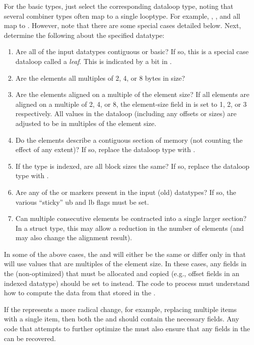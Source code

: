 \documentclass{article}
\begin{document}
\begin{enumerate}
  For the basic types, just select the corresponding dataloop type,
  noting that several combiner types often map to a single looptype.  For
  example, , ,
  and  all map to
  .  However, note that there are some special cases
  detailed below.  
  Next, determine the following about the specified datatype:
  \begin{enumerate}
    \item Are all of the input datatypes contiguous or basic?  If so, this is
          a special case dataloop called a \emph{leaf}.  This is indicated 
          by a bit in .
    \item Are the elements all multiples of 2, 4, or 8 bytes in size?
    \item Are the elements aligned on a multiple of the element size?
      If all elements are aligned on a multiple of 2, 4, or 8, the 
      element-size field in  is set to 1, 2, or 3
      respectively.  All values in the dataloop (including any offsets or
      sizes) are adjusted to be in multiples of the element size.
    \item Do the elements describe a contiguous section of memory (not
      counting the effect of any extent)?
      If so, replace the dataloop type with .
    \item If the type is indexed, are all block sizes the same?
      If so, replace the dataloop type with .
    \item Are any of the  or  markers
      present in the input (old) datatypes?
    If so, the various ``sticky'' ub and lb flags must be set.
    \item Can multiple consecutive elements be contracted into a single 
      larger section?  In a struct type, this may allow a reduction in
      the number of elements (and may also change the alignment result).
  \end{enumerate}
  In some of the above cases, the  and  will
  either be the same or differ only in that  will use 
  values that are multiples of the element size.  In these cases, any 
  fields in the (non-optimized)  that must be allocated and 
  copied (e.g., offset fields in an indexed datatype) should be set to
   instead.  The code to process  must
  understand how to compute the data from that stored in the
  .  

  If the  represents a more radical change, for example,
  replacing multiple items with a single item, then both the 
  and  should contain the necessary fields.  Any code that
  attempts to further optimize the  must also ensure that
  any  fields in the  can be recovered.

\end{enumerate}
\end{document}
